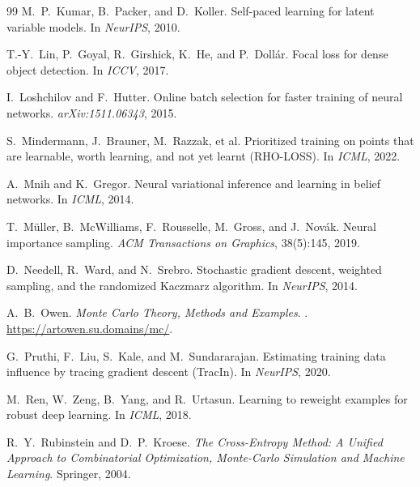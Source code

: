 \documentclass[11pt]{article}
\begin{document}
\begin{thebibliography}{99}
M.~P.~Kumar, B.~Packer, and D.~Koller.
\newblock Self-paced learning for latent variable models.
\newblock In \emph{NeurIPS}, 2010.

T.-Y.~Lin, P.~Goyal, R.~Girshick, K.~He, and P.~Doll\'ar.
\newblock Focal loss for dense object detection.
\newblock In \emph{ICCV}, 2017.

I.~Loshchilov and F.~Hutter.
\newblock Online batch selection for faster training of neural networks.
\newblock \emph{arXiv:1511.06343}, 2015.

S.~Mindermann, J.~Brauner, M.~Razzak, et al.
\newblock Prioritized training on points that are learnable, worth learning, and
not yet learnt (RHO-LOSS).
\newblock In \emph{ICML}, 2022.

A.~Mnih and K.~Gregor.
\newblock Neural variational inference and learning in belief networks.
\newblock In \emph{ICML}, 2014.

T.~M\"uller, B.~McWilliams, F.~Rousselle, M.~Gross, and J.~Nov\'ak.
\newblock Neural importance sampling.
\newblock \emph{ACM Transactions on Graphics}, 38(5):145, 2019.

D.~Needell, R.~Ward, and N.~Srebro.
\newblock Stochastic gradient descent, weighted sampling, and the randomized
Kaczmarz algorithm.
\newblock In \emph{NeurIPS}, 2014.

A.~B.~Owen.
\newblock \emph{Monte Carlo Theory, Methods and Examples}.
. \url{https://artowen.su.domains/mc/}.

G.~Pruthi, F.~Liu, S.~Kale, and M.~Sundararajan.
\newblock Estimating training data influence by tracing gradient descent (TracIn).
\newblock In \emph{NeurIPS}, 2020.

M.~Ren, W.~Zeng, B.~Yang, and R.~Urtasun.
\newblock Learning to reweight examples for robust deep learning.
\newblock In \emph{ICML}, 2018.

R.~Y.~Rubinstein and D.~P.~Kroese.
\newblock \emph{The Cross-Entropy Method: A Unified Approach to Combinatorial
Optimization, Monte-Carlo Simulation and Machine Learning}.
\newblock Springer, 2004.


\end{thebibliography}
\end{document}
